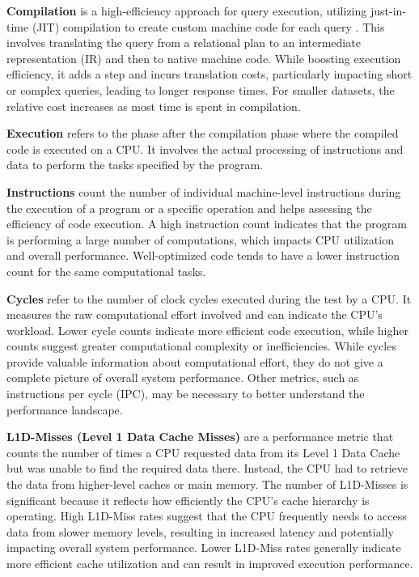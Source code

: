 \textbf{Compilation} is a high-efficiency approach for query execution, utilizing just-in-time (JIT) compilation to create custom machine code for each query \parencite{Bringin-Compiling-Databases-to-RISC,generationOfMachineCode}. This involves translating the query from a relational plan to an intermediate representation (IR) and then to native machine code. While boosting execution efficiency, it adds a step and incurs translation costs, particularly impacting short or complex queries, leading to longer response times. For smaller datasets, the relative cost increases as most time is spent in compilation. 

\textbf{Execution} refers to the phase after the compilation phase where the compiled code is executed on a CPU. It involves the actual processing of instructions and data to perform the tasks specified by the program.

\textbf{Instructions} count the number of individual machine-level instructions during the execution of a program or a specific operation and helps assessing the efficiency of code execution. A high instruction count indicates that the program is performing a large number of computations, which impacts CPU utilization and overall performance. Well-optimized code tends to have a lower instruction count for the same computational tasks. 

\textbf{Cycles} refer to the number of clock cycles executed during the test by a CPU. It measures the raw computational effort involved and can indicate the CPU's workload. Lower cycle counts indicate more efficient code execution, while higher counts suggest greater computational complexity or inefficiencies. While cycles provide valuable information about computational effort, they do not give a complete picture of overall system performance. Other metrics, such as instructions per cycle (IPC), may be necessary to better understand the performance landscape.

\textbf{L1D-Misses (Level 1 Data Cache Misses)} are a performance metric that counts the number of times a CPU requested data from its Level 1 Data Cache but was unable to find the required data there. Instead, the CPU had to retrieve the data from higher-level caches or main memory. The number of L1D-Misses is significant because it reflects how efficiently the CPU's cache hierarchy is operating. High L1D-Miss rates suggest that the CPU frequently needs to access data from slower memory levels, resulting in increased latency and potentially impacting overall system performance. Lower L1D-Miss rates generally indicate more efficient cache utilization and can result in improved execution performance.

